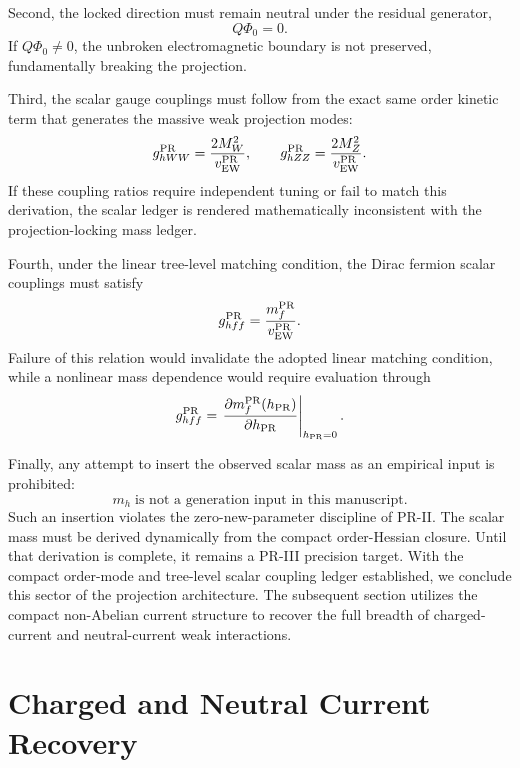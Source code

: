 \documentclass[11pt]{article}
\begin{document}
Second, the locked direction must remain neutral under the residual generator,
\begin{equation}
Q\Phi_0=0.
\end{equation}
If \(Q\Phi_0\neq0\), the unbroken electromagnetic boundary is not preserved, fundamentally breaking the projection.

Third, the scalar gauge couplings must follow from the exact same order kinetic term that generates the massive weak projection modes:
\begin{equation}
g_{hWW}^{\rm PR}
=
\frac{2M_W^2}{v_{\rm EW}^{\rm PR}},
\qquad
g_{hZZ}^{\rm PR}
=
\frac{2M_Z^2}{v_{\rm EW}^{\rm PR}}.
\end{equation}
If these coupling ratios require independent tuning or fail to match this derivation, the scalar ledger is rendered mathematically inconsistent with the projection-locking mass ledger.

Fourth, under the linear tree-level matching condition, the Dirac fermion scalar couplings must satisfy
\begin{equation}
g_{hff}^{\rm PR}
=
\frac{m_f^{\rm PR}}{v_{\rm EW}^{\rm PR}}.
\end{equation}
Failure of this relation would invalidate the adopted linear matching condition, while a nonlinear mass dependence would require evaluation through
\begin{equation}
g_{hff}^{\rm PR}
=
\left.
\frac{\partial m_f^{\rm PR}(h_{\rm PR})}
{\partial h_{\rm PR}}
\right|_{h_{\rm PR}=0}.
\end{equation}

Finally, any attempt to insert the observed scalar mass as an empirical input is prohibited:
\begin{equation}
\boxed{
m_h\;\text{is not a generation input in this manuscript}.
}
\end{equation}
Such an insertion violates the zero-new-parameter discipline of PR-II. The scalar mass must be derived dynamically from the compact order-Hessian closure. Until that derivation is complete, it remains a PR-III precision target. With the compact order-mode and tree-level scalar coupling ledger established, we conclude this sector of the projection architecture. The subsequent section utilizes the compact non-Abelian current structure to recover the full breadth of charged-current and neutral-current weak interactions.

\section{Charged and Neutral Current Recovery}
\label{sec:pr2_charged_neutral_current_recovery}
\end{document}
